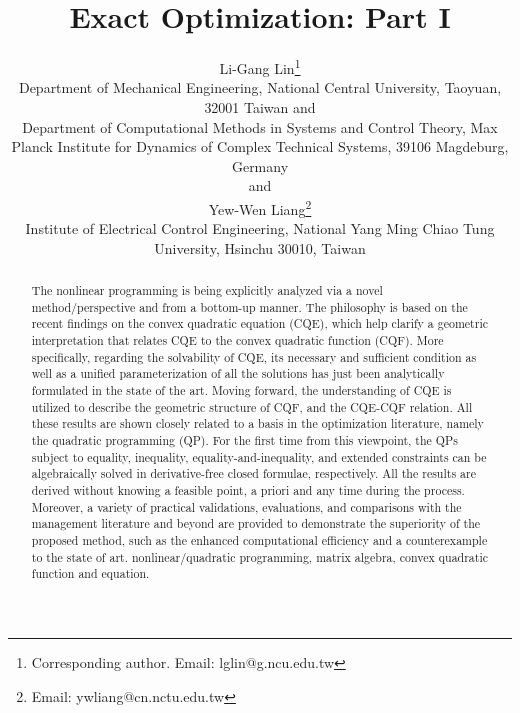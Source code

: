 \documentclass{imaman}
\numberwithin{equation}{section}
\begin{document}

\thispagestyle{empty}

\title{Exact Optimization: Part I}
\author{ {\sc
Li-Gang Lin\thanks{Corresponding author. Email: lglin@g.ncu.edu.tw}} \\[2pt]
Department of Mechanical Engineering, National Central University, Taoyuan, 32001 Taiwan and\\
Department of Computational Methods in Systems and Control Theory, Max Planck Institute for Dynamics of Complex Technical Systems, 39106 Magdeburg, Germany\\[6pt]
{\sc and}\\[6pt]
{\sc Yew-Wen Liang}\thanks{Email: ywliang@cn.nctu.edu.tw}\\[2pt]
Institute of Electrical Control Engineering, National Yang Ming Chiao Tung University, Hsinchu 30010, Taiwan
}
\pagestyle{headings}
\maketitle

\begin{abstract}
{The nonlinear programming is being explicitly analyzed via a novel method/perspective and from a bottom-up manner. The philosophy is based on the recent findings on the convex quadratic equation (CQE), which help clarify a geometric interpretation that relates CQE to the convex quadratic function (CQF). More specifically, regarding the solvability of CQE, its necessary and sufficient condition as well as a unified parameterization of all the solutions has just been analytically formulated in the state of the art. Moving forward, the understanding of CQE is utilized to describe the geometric structure of CQF, and the CQE-CQF relation. All these results are shown closely related to a basis in the optimization literature, namely the quadratic programming (QP). For the first time from this viewpoint, the QPs subject to equality, inequality, equality-and-inequality, and extended constraints can be algebraically solved in derivative-free closed formulae, respectively. All the results are derived without knowing a feasible point, a priori and any time during the process. Moreover, a variety of practical validations, evaluations, and comparisons with the management literature and beyond are provided to demonstrate the superiority of the proposed method, such as the enhanced computational efficiency and a counterexample to the state of art.}
{nonlinear/quadratic programming, matrix algebra, convex quadratic function and equation.}
\end{abstract}
\end{document}
